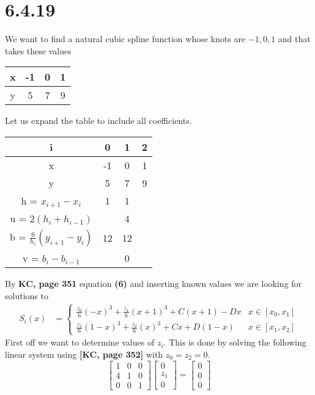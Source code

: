 \documentclass[12pt]{article}
\author{Nikolaj Dybdahl Rathcke}
\begin{document}
\section*{6.4.19}
We want to find a natural cubic spline function whose knots are $-1,0,1$ and that takes these values
\begin{center}
\begin{tabular}{c||c|c|c}
x & -1 & 0 & 1 \\ 
\hline 
y & 5 & 7 & 9
\end{tabular} 
\end{center}
Let us expand the table to include all coefficients.
\begin{center}
\begin{tabular}{c||c|c|c} 
i & 0 & 1 & 2 \\
\hline
x & -1 & 0 & 1 \\ 
\hline 
y & 5 & 7 & 9 \\
\hline 
h = $x_{i+1}-x_i$ & 1 & 1 & \\
\hline
u = $2(h_i+h_{i-1})$ & & 4 & \\
\hline
b = $\frac{6}{h_i}(y_{i+1}-y_i)$ & 12 & 12 & \\
\hline
v = $b_i-b_{i-1}$ & & 0 &
\end{tabular} 
\end{center}
By \textbf{KC, page 351} equation \textbf{(6)} and inserting known values we are looking for solutions to
\begin{align*}
S_i(x) &= \left\{ \begin{array}{rl}
\frac{z_0}{6}(-x)^3+\frac{z_1}{6}(x+1)^3 + C(x+1) - Dx &x\in [x_0,x_1]\\
\frac{z_1}{6}(1-x)^3+\frac{z_2}{6}(x)^3 + Cx + D(1-x) &x\in [x_1,x_2]
\end{array} \right.
\end{align*}
First off we want to determine values of $z_i$. This is done by solving the following linear system using \textbf{[KC, page 352]} with $z_0=z_2=0$.
$$
\begin{bmatrix}
1 & 0 & 0 \\
4 & 1 & 0 \\
0 & 0 & 1 
\end{bmatrix}
\begin{bmatrix}
0 \\
z_1 \\
0
\end{bmatrix}
=
\begin{bmatrix}
0 \\
0 \\
0
\end{bmatrix}
$$
\end{document}
